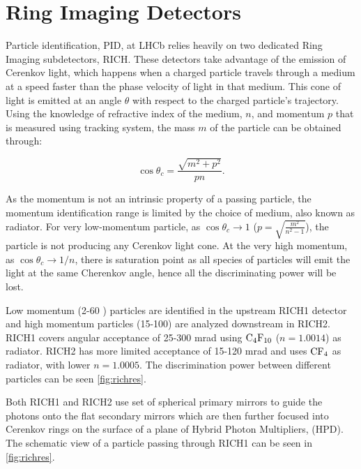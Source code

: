 \section{Ring Imaging Detectors }
\label{richsec}
Particle identification, \Gls{PID}, at \Gls{LHCb} relies heavily on two dedicated Ring Imaging subdetectors, \gls{RICH}. These detectors take advantage of the emission of Cerenkov light, which happens when a charged particle travels through a medium at a speed faster than the phase velocity of light in that medium. This cone of light is emitted at an angle $\theta$ with respect to the charged particle's trajectory. Using the knowledge of refractive index of the medium, $n$, and momentum $p$ that is measured using tracking system, the mass $m$ of the particle can be obtained through:

\begin{equation}
	\cos\theta_{c} =  \frac{\sqrt{m^{2} + p^{2}}}{pn}.
\end{equation}

As the momentum is not an intrinsic property of a passing particle, the momentum identification range is limited by the choice of medium, also known as radiator. For very low-momentum particle, as $\cos\theta_{c} \rightarrow 1$ ($p=\sqrt{\frac{m^{2}}{n^{2}-1}}$), the particle is not producing any Cerenkov light cone. At the very high momentum, as $\cos\theta_{c} \rightarrow 1/n$, there is saturation point as all species of particles will emit the light at the same Cherenkov angle, hence all the discriminating power will be lost.

Low momentum (2-60 \gev) particles are identified in the upstream \gls{RICH1} detector and high momentum particles (15-100) \gev are analyzed downstream in \gls{RICH2}. \gls{RICH1} covers angular acceptance of 25-300 mrad using $\rm{C_{4}F_{10}}$ ($n = 1.0014$) as radiator. \gls{RICH2} has more limited acceptance of 15-120 mrad and uses $\rm{CF_{4}}$ as radiator, with lower $n=1.0005$. The discrimination power between different particles can be seen \autoref{fig:richres}. 


Both \gls{RICH1} and \gls{RICH2} use set of spherical primary mirrors to guide the photons onto the flat secondary mirrors which are then further focused into Cerenkov rings on the surface of a plane of Hybrid Photon Multipliers, (\Gls{HPD}). The schematic view of a particle passing through \gls{RICH1} can be seen in \autoref{fig:richres}. 


